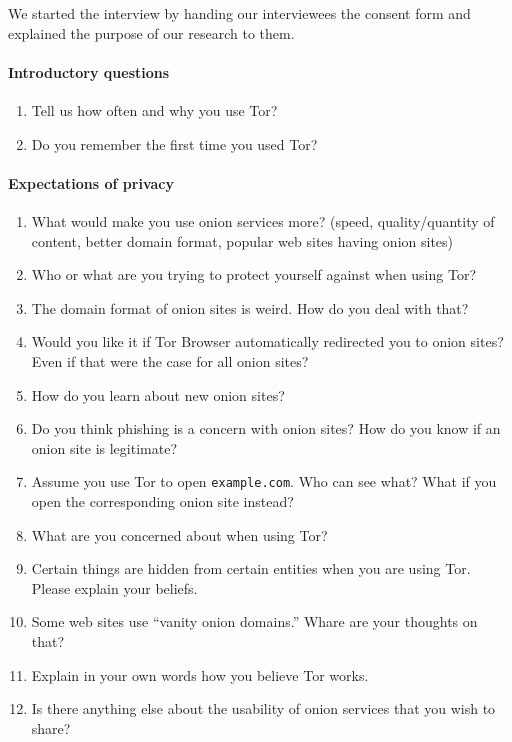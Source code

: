 We started the interview by handing our interviewees the consent form and
explained the purpose of our research to them.

\paragraph{Introductory questions}
\begin{enumerate}
    \item Tell us how often and why you use Tor?
    \item Do you remember the first time you used Tor?
\end{enumerate}

\paragraph{Expectations of privacy}
\begin{enumerate}
    \item What would make you use onion services more? (speed, quality/quantity
        of content, better domain format, popular web sites having onion sites)
    \item Who or what are you trying to protect yourself against when using Tor?
    \item The domain format of onion sites is weird.  How do you deal with that?
    \item Would you like it if Tor Browser automatically redirected you to onion
        sites?  Even if that were the case for all onion sites?
    \item How do you learn about new onion sites?
    \item Do you think phishing is a concern with onion sites?  How do you know
        if an onion site is legitimate?
    \item Assume you use Tor to open \texttt{example.com}.  Who can see what?
        What if you open the corresponding onion site instead?
    \item What are you concerned about when using Tor?
    \item Certain things are hidden from certain entities when you are using
        Tor.  Please explain your beliefs.
    \item Some web sites use ``vanity onion domains.''  Whare are your thoughts
        on that?
    \item Explain in your own words how you believe Tor works.
    \item Is there anything else about the usability of onion services that you
        wish to share?
\end{enumerate}

